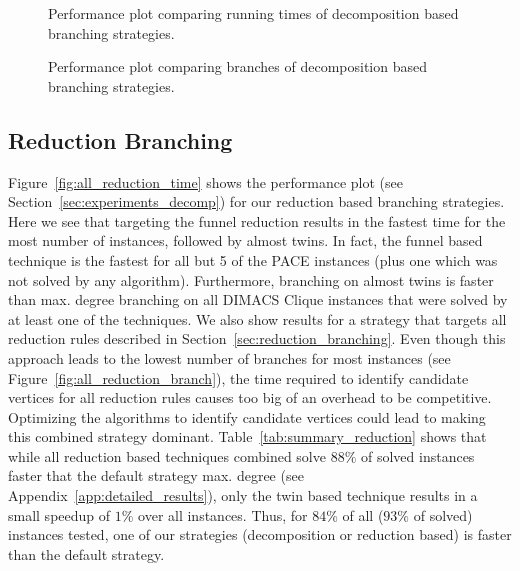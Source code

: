 \documentclass[a4paper,UKenglish,cleveref, autoref, thm-restate]{lipics-v2021}
\begin{document}

\begin{figure}[t]
	\centering
	
	\caption{Performance plot comparing running times of decomposition based branching strategies.}
	\label{fig:all_decomp_time}
\end{figure}

\begin{figure}[t]
	\centering
	
	\caption{Performance plot comparing branches of decomposition based branching strategies.}
	\label{fig:all_decomp_branch}
\end{figure}


\subsection{Reduction Branching}
Figure~\ref{fig:all_reduction_time} shows the performance plot (see
Section~\ref{sec:experiments_decomp}) for our reduction
based branching strategies. Here we see that targeting the funnel reduction
results in the fastest time for the most number of instances, followed by almost
twins. In fact, the
funnel based technique is the fastest for all but 5 of the PACE instances (plus
one which was not solved by any algorithm). Furthermore, branching on almost
twins is faster than max. degree branching on all DIMACS Clique instances that
were solved by at least one of the techniques. We also show results for a strategy that targets all reduction rules
described in Section~\ref{sec:reduction_branching}. Even though this approach
leads to the lowest number of branches for most instances (see Figure~\ref{fig:all_reduction_branch}), the time required to
identify candidate vertices for all reduction rules causes too big of an
overhead to be competitive. Optimizing the algorithms to identify candidate
vertices could lead to making this combined strategy
dominant. Table~\ref{tab:summary_reduction} shows that while all reduction based
techniques combined solve $88\%$ of solved instances faster that the default
strategy max. degree (see Appendix~\ref{app:detailed_results}), only the twin
based technique results in a small speedup of $1\%$ over all instances.
Thus, for $84\%$ of all ($93\%$ of solved) instances tested, one of our strategies (decomposition or reduction based) is faster than the default strategy.
\end{document}
